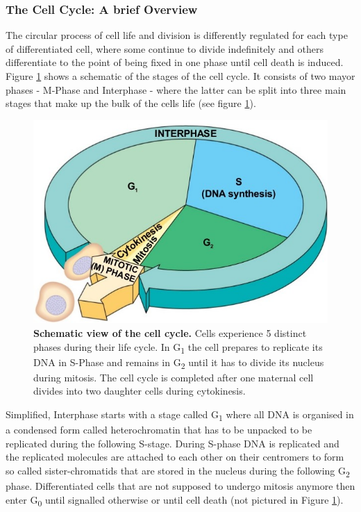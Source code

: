 \subsubsection{The Cell Cycle: A brief Overview}
The circular process of cell life and division is differently regulated for each type of differentiated cell, where some continue to divide indefinitely and others differentiate to the point of being fixed in one phase until cell death is induced. Figure \ref{fig:cellCycle} shows a schematic of the stages of the cell cycle. It consists of two mayor phases - M-Phase and Interphase - where the latter can be split into three main stages that make up the bulk of the cells life (see figure \ref{fig:cellCycle}). 
\begin{figure}
    \centering
    \includegraphics[width=.68\textwidth]{resources/images/Intro/cellCycle.jpg}
    \caption[Schematic view of the cell cycle]{\textbf{Schematic view of the cell cycle. }Cells experience 5 distinct phases during their life cycle. In G\textsubscript{1} the cell prepares to replicate its DNA in S-Phase and remains in G\textsubscript{2} until it has to divide its nucleus during mitosis. The cell cycle is completed after one maternal cell divides into two daughter cells during cytokinesis.\\\citep{Campbell.2015}}
    \label{fig:cellCycle}
\end{figure}
Simplified, Interphase starts with a stage called G\textsubscript{1} where all DNA is organised in a condensed form called heterochromatin that has to be unpacked to be replicated during the following S-stage. During S-phase DNA is replicated and the replicated molecules are attached to each other on their centromers to form so called sister-chromatids that are stored in the nucleus during the following G\textsubscript{2} phase. Differentiated cells that are not supposed to undergo mitosis anymore then enter G\textsubscript{0} until signalled otherwise or until cell death (not pictured in Figure \ref{fig:cellCycle}). 
